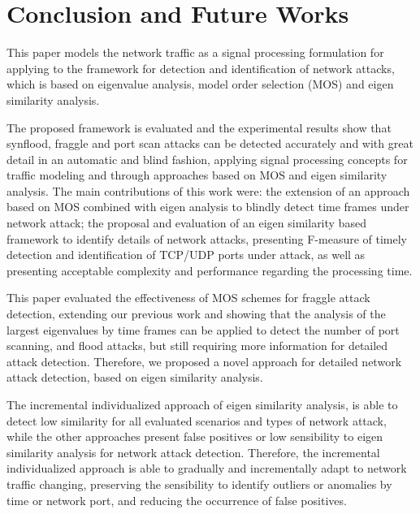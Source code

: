 \documentclass[review]{elsarticle}
\begin{document}
\section{Conclusion and Future Works}
\label{sec:conclusionandfutureworks}

This paper models the network traffic as a signal processing formulation for applying to the framework for detection and identification of network attacks, which is based on eigenvalue analysis, model order selection (MOS) and eigen similarity analysis.

The proposed framework is evaluated and the experimental results show that synflood, fraggle and port scan attacks can be detected accurately and with great detail in an automatic and blind fashion, applying signal processing concepts for traffic modeling and through approaches based on MOS and eigen similarity analysis. The main contributions of this work were: the extension of an approach based on MOS combined with eigen analysis to blindly detect time frames under network attack; the proposal and evaluation of an eigen similarity based framework to identify details of network attacks, presenting F-measure of timely detection and identification of TCP/UDP ports under attack, as well as presenting acceptable complexity and performance regarding the processing time.

This paper evaluated the effectiveness of MOS schemes for fraggle attack detection, extending our previous work and showing that the analysis of the largest eigenvalues by time frames can be applied to detect the number of port scanning, and flood attacks, but still requiring more information for detailed attack detection. Therefore, we proposed a novel approach for detailed network attack detection, based on eigen similarity analysis.

The incremental individualized approach of eigen similarity analysis, is able to detect low similarity for all evaluated scenarios and types of network attack, while the other approaches present false positives or low sensibility to eigen similarity analysis for network attack detection. Therefore, the incremental individualized approach is able to gradually and incrementally adapt to network traffic changing, preserving the sensibility to identify outliers or anomalies by time or network port, and reducing the occurrence of false positives.
\end{document}
